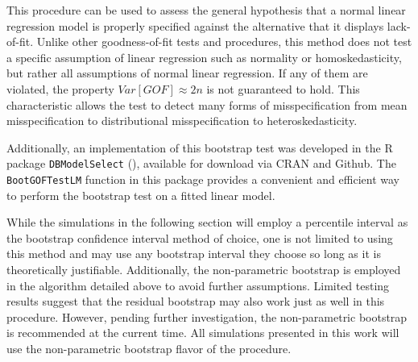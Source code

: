 \documentclass[12pt]{article} %
\theoremstyle{definition}
\begin{document}
		This procedure can be used to assess the general hypothesis that a normal linear regression model is properly specified against the alternative that it displays lack-of-fit.
		Unlike other goodness-of-fit tests and procedures, this method does not test a specific assumption of linear regression such as normality or homoskedasticity, but rather
		all assumptions of normal linear regression. If any of them are violated, the property $Var[GOF] \approx 2n$ is not guaranteed to hold. This characteristic allows the test to detect
		many forms of misspecification from mean misspecification to distributional misspecification to heteroskedasticity. 

		Additionally, an implementation of this bootstrap test was developed in the R package \verb|DBModelSelect| (\cite{Koeneman}), available for download via CRAN and Github.
		The \verb|BootGOFTestLM| function in this package provides a convenient and efficient way to perform the bootstrap test on a fitted linear model.
		
		While the simulations in the following section will employ a percentile interval as the bootstrap confidence interval method of choice, one is not limited to using this method
		and may use any bootstrap interval they choose so long as it is theoretically justifiable. Additionally, the non-parametric bootstrap is employed in the algorithm detailed above to avoid further
		assumptions. Limited testing results suggest that the residual bootstrap may also work just as well in this procedure. However, pending further investigation, the non-parametric
		bootstrap is recommended at the current time. All simulations presented in this work will use the non-parametric bootstrap flavor of the procedure.



\end{document}

